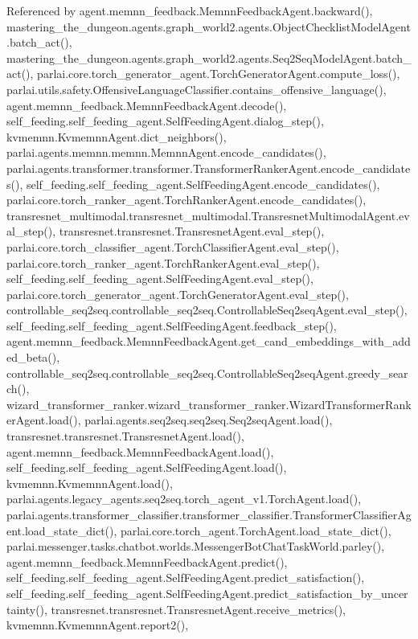Referenced by agent.\+memnn\+\_\+feedback.\+Memnn\+Feedback\+Agent.\+backward(), mastering\+\_\+the\+\_\+dungeon.\+agents.\+graph\+\_\+world2.\+agents.\+Object\+Checklist\+Model\+Agent.\+batch\+\_\+act(), mastering\+\_\+the\+\_\+dungeon.\+agents.\+graph\+\_\+world2.\+agents.\+Seq2\+Seq\+Model\+Agent.\+batch\+\_\+act(), parlai.\+core.\+torch\+\_\+generator\+\_\+agent.\+Torch\+Generator\+Agent.\+compute\+\_\+loss(), parlai.\+utils.\+safety.\+Offensive\+Language\+Classifier.\+contains\+\_\+offensive\+\_\+language(), agent.\+memnn\+\_\+feedback.\+Memnn\+Feedback\+Agent.\+decode(), self\+\_\+feeding.\+self\+\_\+feeding\+\_\+agent.\+Self\+Feeding\+Agent.\+dialog\+\_\+step(), kvmemnn.\+Kvmemnn\+Agent.\+dict\+\_\+neighbors(), parlai.\+agents.\+memnn.\+memnn.\+Memnn\+Agent.\+encode\+\_\+candidates(), parlai.\+agents.\+transformer.\+transformer.\+Transformer\+Ranker\+Agent.\+encode\+\_\+candidates(), self\+\_\+feeding.\+self\+\_\+feeding\+\_\+agent.\+Self\+Feeding\+Agent.\+encode\+\_\+candidates(), parlai.\+core.\+torch\+\_\+ranker\+\_\+agent.\+Torch\+Ranker\+Agent.\+encode\+\_\+candidates(), transresnet\+\_\+multimodal.\+transresnet\+\_\+multimodal.\+Transresnet\+Multimodal\+Agent.\+eval\+\_\+step(), transresnet.\+transresnet.\+Transresnet\+Agent.\+eval\+\_\+step(), parlai.\+core.\+torch\+\_\+classifier\+\_\+agent.\+Torch\+Classifier\+Agent.\+eval\+\_\+step(), parlai.\+core.\+torch\+\_\+ranker\+\_\+agent.\+Torch\+Ranker\+Agent.\+eval\+\_\+step(), self\+\_\+feeding.\+self\+\_\+feeding\+\_\+agent.\+Self\+Feeding\+Agent.\+eval\+\_\+step(), parlai.\+core.\+torch\+\_\+generator\+\_\+agent.\+Torch\+Generator\+Agent.\+eval\+\_\+step(), controllable\+\_\+seq2seq.\+controllable\+\_\+seq2seq.\+Controllable\+Seq2seq\+Agent.\+eval\+\_\+step(), self\+\_\+feeding.\+self\+\_\+feeding\+\_\+agent.\+Self\+Feeding\+Agent.\+feedback\+\_\+step(), agent.\+memnn\+\_\+feedback.\+Memnn\+Feedback\+Agent.\+get\+\_\+cand\+\_\+embeddings\+\_\+with\+\_\+added\+\_\+beta(), controllable\+\_\+seq2seq.\+controllable\+\_\+seq2seq.\+Controllable\+Seq2seq\+Agent.\+greedy\+\_\+search(), wizard\+\_\+transformer\+\_\+ranker.\+wizard\+\_\+transformer\+\_\+ranker.\+Wizard\+Transformer\+Ranker\+Agent.\+load(), parlai.\+agents.\+seq2seq.\+seq2seq.\+Seq2seq\+Agent.\+load(), transresnet.\+transresnet.\+Transresnet\+Agent.\+load(), agent.\+memnn\+\_\+feedback.\+Memnn\+Feedback\+Agent.\+load(), self\+\_\+feeding.\+self\+\_\+feeding\+\_\+agent.\+Self\+Feeding\+Agent.\+load(), kvmemnn.\+Kvmemnn\+Agent.\+load(), parlai.\+agents.\+legacy\+\_\+agents.\+seq2seq.\+torch\+\_\+agent\+\_\+v1.\+Torch\+Agent.\+load(), parlai.\+agents.\+transformer\+\_\+classifier.\+transformer\+\_\+classifier.\+Transformer\+Classifier\+Agent.\+load\+\_\+state\+\_\+dict(), parlai.\+core.\+torch\+\_\+agent.\+Torch\+Agent.\+load\+\_\+state\+\_\+dict(), parlai.\+messenger.\+tasks.\+chatbot.\+worlds.\+Messenger\+Bot\+Chat\+Task\+World.\+parley(), agent.\+memnn\+\_\+feedback.\+Memnn\+Feedback\+Agent.\+predict(), self\+\_\+feeding.\+self\+\_\+feeding\+\_\+agent.\+Self\+Feeding\+Agent.\+predict\+\_\+satisfaction(), self\+\_\+feeding.\+self\+\_\+feeding\+\_\+agent.\+Self\+Feeding\+Agent.\+predict\+\_\+satisfaction\+\_\+by\+\_\+uncertainty(), transresnet.\+transresnet.\+Transresnet\+Agent.\+receive\+\_\+metrics(), kvmemnn.\+Kvmemnn\+Agent.\+report2(), 